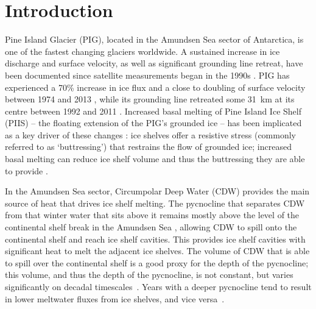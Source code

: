 \documentclass[draft]{agujournal2019}
\begin{document}
\section{Introduction}\label{S:Introduction}
Pine Island Glacier (PIG), located in the Amundsen Sea sector of Antarctica, is one of the fastest changing glaciers worldwide. A sustained increase in ice discharge and surface velocity, as well as significant grounding line retreat, have been documented since satellite measurements began in the 1990s \cite{Rignot2002AnnGlac, Rignot2008GRL, Rignot2011Science, Mouginot2014GRL, Gardner2018Cryo}. PIG has experienced a 70\% increase in ice flux and a close to doubling of surface velocity between 1974 and 2013 \cite{Mouginot2014GRL}, while its grounding line retreated some 31~km at its centre between 1992 and 2011 \cite{Rignot2014GRL}. Increased basal melting of Pine Island Ice Shelf (PIIS) -- the floating extension of the PIG's grounded ice -- has been implicated as a key driver of these changes \cite{Shepherd2004GRL, Pritchard2012Nature, Rignot2019PNAS}: ice shelves offer a resistive stress (commonly referred to as `buttressing') that restrains the flow of grounded ice; increased basal melting can reduce ice shelf volume and thus the buttressing they are able to provide \cite{Gudmundsson2013Cryo, Reese2018NatureClimCh, Gudmundsson2019GRL,Gagliardini2010GRL,Goldberg2019GRL, DeRydt2021Cryosphere}.

In the Amundsen Sea sector, Circumpolar Deep Water (CDW) provides the main source of heat that drives ice shelf melting. The pycnocline that separates CDW from that winter water that sits above it remains mostly above the level of the continental shelf break in the Amundsen Sea \cite{Jacobs2015Oceanography, Heywood2016Oceanography}, allowing CDW to spill onto the continental shelf and reach ice shelf cavities. This provides ice shelf cavities with significant heat to melt the adjacent ice shelves. The volume of CDW that is able to spill over the continental shelf is a good proxy for the depth of the pycnocline; this volume, and thus the depth of the pycnocline, is not constant, but varies significantly on decadal timescales~\cite{Jenkins2018NatureGeo}. Years with a deeper pycnocline tend to result in lower meltwater fluxes from ice shelves, and vice versa~\cite{Jacobs2011NatureGeosci,Dutrieux2014Science}.
\end{document}

